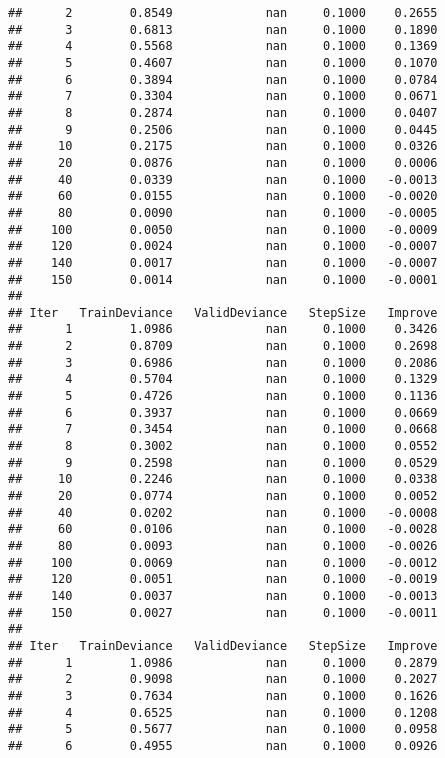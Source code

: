 \documentclass[
]{article}
\begin{document}
\begin{verbatim}
##      2        0.8549             nan     0.1000    0.2655
##      3        0.6813             nan     0.1000    0.1890
##      4        0.5568             nan     0.1000    0.1369
##      5        0.4607             nan     0.1000    0.1070
##      6        0.3894             nan     0.1000    0.0784
##      7        0.3304             nan     0.1000    0.0671
##      8        0.2874             nan     0.1000    0.0407
##      9        0.2506             nan     0.1000    0.0445
##     10        0.2175             nan     0.1000    0.0326
##     20        0.0876             nan     0.1000    0.0006
##     40        0.0339             nan     0.1000   -0.0013
##     60        0.0155             nan     0.1000   -0.0020
##     80        0.0090             nan     0.1000   -0.0005
##    100        0.0050             nan     0.1000   -0.0009
##    120        0.0024             nan     0.1000   -0.0007
##    140        0.0017             nan     0.1000   -0.0007
##    150        0.0014             nan     0.1000   -0.0001
## 
## Iter   TrainDeviance   ValidDeviance   StepSize   Improve
##      1        1.0986             nan     0.1000    0.3426
##      2        0.8709             nan     0.1000    0.2698
##      3        0.6986             nan     0.1000    0.2086
##      4        0.5704             nan     0.1000    0.1329
##      5        0.4726             nan     0.1000    0.1136
##      6        0.3937             nan     0.1000    0.0669
##      7        0.3454             nan     0.1000    0.0668
##      8        0.3002             nan     0.1000    0.0552
##      9        0.2598             nan     0.1000    0.0529
##     10        0.2246             nan     0.1000    0.0338
##     20        0.0774             nan     0.1000    0.0052
##     40        0.0202             nan     0.1000   -0.0008
##     60        0.0106             nan     0.1000   -0.0028
##     80        0.0093             nan     0.1000   -0.0026
##    100        0.0069             nan     0.1000   -0.0012
##    120        0.0051             nan     0.1000   -0.0019
##    140        0.0037             nan     0.1000   -0.0013
##    150        0.0027             nan     0.1000   -0.0011
## 
## Iter   TrainDeviance   ValidDeviance   StepSize   Improve
##      1        1.0986             nan     0.1000    0.2879
##      2        0.9098             nan     0.1000    0.2027
##      3        0.7634             nan     0.1000    0.1626
##      4        0.6525             nan     0.1000    0.1208
##      5        0.5677             nan     0.1000    0.0958
##      6        0.4955             nan     0.1000    0.0926

\end{verbatim}
\end{document}
